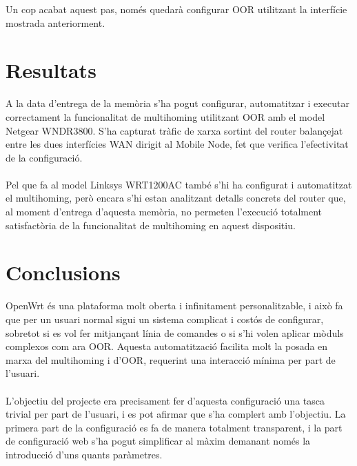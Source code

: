 \documentclass[11pt]{article}
\begin{document}
Un cop acabat aquest pas, només quedarà configurar OOR utilitzant la interfície mostrada anteriorment.	
	
\section{Resultats}
A la data d’entrega de la memòria s’ha pogut configurar, automatitzar i executar correctament la funcionalitat de multihoming utilitzant OOR amb el model Netgear WNDR3800. S’ha capturat tràfic de xarxa sortint del router balançejat entre les dues interfícies WAN dirigit al Mobile Node, fet que verifica l’efectivitat de la configuració.\\
\\
Pel que fa al model Linksys WRT1200AC també s’hi ha configurat i automatitzat el multihoming, però encara s’hi estan analitzant detalls concrets del router que, al moment d’entrega d’aquesta memòria, no permeten l’execució totalment satisfactòria de la funcionalitat de multihoming en aquest dispositiu.

\section{Conclusions}
OpenWrt és una plataforma molt oberta i infinitament personalitzable, i això fa que per un usuari normal sigui un sistema complicat i costós de configurar, sobretot si es vol fer mitjançant línia de comandes o si s’hi volen aplicar mòduls complexos com ara OOR. Aquesta automatització facilita molt la posada en marxa del multihoming i d’OOR, requerint una interacció mínima per part de l’usuari.\\
\\
L'objectiu del projecte era precisament fer d'aquesta configuració una tasca trivial per part de l'usuari, i es pot afirmar que s'ha complert amb l'objectiu. La primera part de la configuració es fa de manera totalment transparent, i la part de configuració web s'ha pogut simplificar al màxim demanant només la introducció d'uns quants paràmetres.\\
\end{document}
